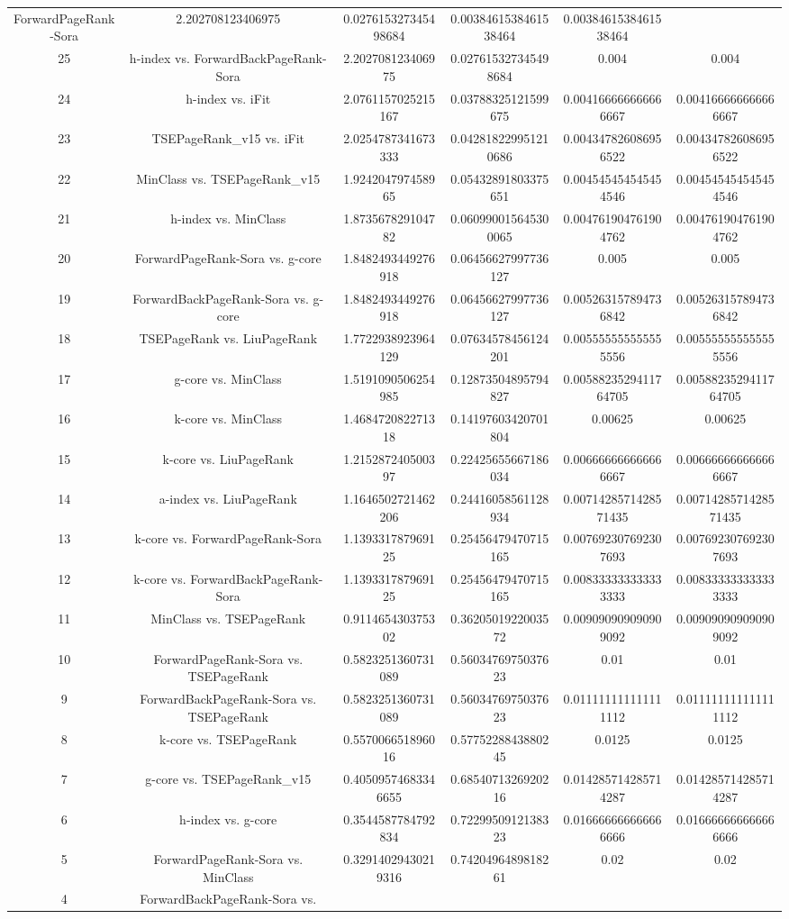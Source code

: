 \documentclass[a4paper,10pt]{article}
\begin{document}
\begin{landscape}
\begin{table}[!htp]
\begin{tabular}{cccccc}
ForwardPageRank-Sora&2.202708123406975&0.027615327345498684&0.0038461538461538464&0.0038461538461538464\\25&h-index vs. ForwardBackPageRank-Sora&2.202708123406975&0.027615327345498684&0.004&0.004\\24&h-index vs. iFit&2.0761157025215167&0.03788325121599675&0.004166666666666667&0.004166666666666667\\23&TSEPageRank_v15 vs. iFit&2.0254787341673333&0.042818229951210686&0.004347826086956522&0.004347826086956522\\22&MinClass vs. TSEPageRank_v15&1.924204797458965&0.05432891803375651&0.004545454545454546&0.004545454545454546\\21&h-index vs. MinClass&1.873567829104782&0.060990015645300065&0.004761904761904762&0.004761904761904762\\20&ForwardPageRank-Sora vs. g-core&1.8482493449276918&0.06456627997736127&0.005&0.005\\19&ForwardBackPageRank-Sora vs. g-core&1.8482493449276918&0.06456627997736127&0.005263157894736842&0.005263157894736842\\18&TSEPageRank vs. LiuPageRank&1.7722938923964129&0.07634578456124201&0.005555555555555556&0.005555555555555556\\17&g-core vs. MinClass&1.5191090506254985&0.12873504895794827&0.0058823529411764705&0.0058823529411764705\\16&k-core vs. MinClass&1.468472082271318&0.14197603420701804&0.00625&0.00625\\15&k-core vs. LiuPageRank&1.215287240500397&0.22425655667186034&0.006666666666666667&0.006666666666666667\\14&a-index vs. LiuPageRank&1.1646502721462206&0.24416058561128934&0.0071428571428571435&0.0071428571428571435\\13&k-core vs. ForwardPageRank-Sora&1.139331787969125&0.25456479470715165&0.007692307692307693&0.007692307692307693\\12&k-core vs. ForwardBackPageRank-Sora&1.139331787969125&0.25456479470715165&0.008333333333333333&0.008333333333333333\\11&MinClass vs. TSEPageRank&0.911465430375302&0.3620501922003572&0.009090909090909092&0.009090909090909092\\10&ForwardPageRank-Sora vs. TSEPageRank&0.5823251360731089&0.5603476975037623&0.01&0.01\\9&ForwardBackPageRank-Sora vs. TSEPageRank&0.5823251360731089&0.5603476975037623&0.011111111111111112&0.011111111111111112\\8&k-core vs. TSEPageRank&0.557006651896016&0.5775228843880245&0.0125&0.0125\\7&g-core vs. TSEPageRank_v15&0.40509574683346655&0.6854071326920216&0.014285714285714287&0.014285714285714287\\6&h-index vs. g-core&0.3544587784792834&0.7229950912138323&0.016666666666666666&0.016666666666666666\\5&ForwardPageRank-Sora vs. MinClass&0.32914029430219316&0.7420496489818261&0.02&0.02\\4&ForwardBackPageRank-Sora vs. 
\end{tabular}
\end{table}
\end{landscape}
\end{document}
